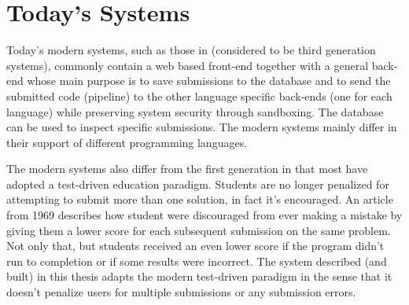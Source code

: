 \section{Today's Systems} \label{sec:todays_systems}
Today's modern systems, such as those in \cite{Gradebot} \cite{Suleman} \cite{GenerationReview}  \cite{Kattis} \cite{Amelung} (considered to be third generation systems), commonly contain a web based front-end together with a general back-end whose main purpose is to save submissions to the database and to send the submitted code (pipeline) to the other language specific back-ends (one for each language) while preserving system security through sandboxing. The database can be used to inspect specific submissions. The modern systems mainly differ in their support of different programming languages.

The modern systems also differ from the first generation in that most have adopted a test-driven education paradigm. Students are no longer penalized for attempting to submit more than one solution, in fact it's encouraged. An article from 1969 \cite{GradingScheme} describes how student were discouraged from ever making a mistake by giving them a lower score for each subsequent submission on the same problem. Not only that, but students received an even lower score if the program didn't run to completion or if some results were incorrect. The system described (and built) in this thesis adapts the modern test-driven paradigm in the sense that it doesn't penalize users for multiple submissions or any submission errors.